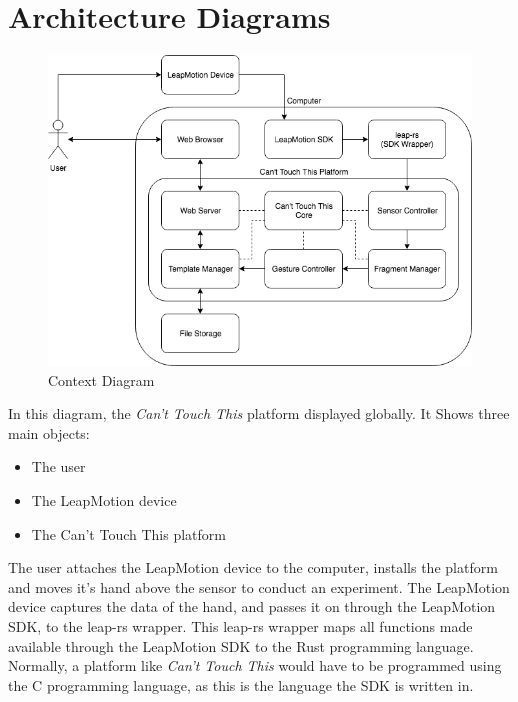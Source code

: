 \documentclass[a4paper]{article}
\providecommand{\tightlist}{%
\setlength{\itemsep}{0pt}\setlength{\parskip}{0pt}}
\begin{document}

  \section{Architecture Diagrams}
  \begin{figure}[h]
    \caption{Context Diagram}
    \centering
    \includegraphics[width=\linewidth]{context-diagram}
  \end{figure}
  In this diagram, the \textit{Can't Touch This} platform displayed globally. It
  Shows three main objects:
  \begin{itemize}
    \tightlist
    \item The user
    \item The LeapMotion device
    \item The Can't Touch This platform
  \end{itemize}
  The user attaches the LeapMotion device to the computer, installs the platform
  and moves it's hand above the sensor to conduct an experiment. The LeapMotion
  device captures the data of the hand, and passes it on through the LeapMotion
  SDK, to the leap-rs wrapper. This leap-rs wrapper maps all functions made
  available through the LeapMotion SDK to the Rust programming language.
  Normally, a platform like \textit{Can't Touch This} would have to be
  programmed using the C programming language, as this is the language the SDK
  is written in.
\end{document}
